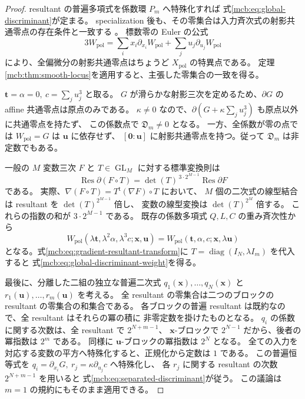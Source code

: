 \begin{proof}
resultant の普遍多項式を係数環 $P_m$ へ特殊化すれば
式\eqref{mcb:eq:global-discriminant}が定まる。
specialization 後も、その零集合は入力斉次式の射影共通零点の存在条件と一致する
\cite[Proposition~2.4]{CMOBuseJouanolouDiscriminant}。
標数零の Euler の公式
\[
 3W_{\mathrm{pol}}
   =\sum_i x_i\partial_{x_i}W_{\mathrm{pol}}
        +\sum_j u_j\partial_{u_j}W_{\mathrm{pol}}
\]
により、全偏微分の射影共通零点はちょうど $X_{\mathrm{pol}}$ の特異点である。
定理\ref{mcb:thm:smooth-locus}を適用すると、主張した零集合の一致を得る。

$\mathbf t=\alpha=0,\ c=\sum_j u_j^3$ と取る。
$G$ が滑らかな射影三次を定めるため、$\partial G$ の affine 共通零点は原点のみである。
$\kappa\ne0$ なので、$\partial(G+\kappa\sum_j u_j^3)$ も原点以外に共通零点を持たず、
この係数点で $\mathfrak D_m\ne0$ となる。
一方、全係数が零の点では $W_{\mathrm{pol}}=G$ は $\mathbf u$ に依存せず、
$[\mathbf0:\mathbf u]$ に射影共通零点を持つ。従って $\mathfrak D_m$ は非定数でもある。

一般の $M$ 変数三次 $F$ と $T\in\operatorname{GL}_M$ に対する標準変換則は
\begin{equation}\label{mcb:eq:gradient-resultant-transform}
 \operatorname{Res}\partial(F\circ T)
     =\det(T)^{\,3\cdot2^{M-1}}\operatorname{Res}\partial F
\end{equation}
である\cite[Proposition~4.13 and its proof]{CMOBuseJouanolouDiscriminant}。
実際、$\nabla(F\circ T)=T^{\mathsf t}(\nabla F)\circ T$ において、
$M$ 個の二次式の線型結合は resultant を $\det(T)^{2^{M-1}}$ 倍し、
変数の線型変換は $\det(T)^{2^M}$ 倍する。
これらの指数の和が $3\cdot2^{M-1}$ である。
既存の係数多項式 $Q,L,C$ の重み斉次性から
\[
 W_{\mathrm{pol}}(\lambda\mathbf t,\lambda^2\alpha,\lambda^3c;
                         \mathbf x,\mathbf u)
   =W_{\mathrm{pol}}(\mathbf t,\alpha,c;\mathbf x,\lambda\mathbf u)
\]
となる。式\eqref{mcb:eq:gradient-resultant-transform}に
$T=\operatorname{diag}(I_N,\lambda I_m)$ を代入すると
式\eqref{mcb:eq:global-discriminant-weight}を得る。

最後に、分離した二組の独立な普遍二次式
$q_1(\mathbf x),\ldots,q_N(\mathbf x)$ と
$r_1(\mathbf u),\ldots,r_m(\mathbf u)$ を考える。
全 resultant の零集合は二つのブロックの resultant の零集合の和集合である。
各ブロックの普遍 resultant は既約なので、全 resultant はそれらの冪の積に
非零定数を掛けたものとなる。
$q_i$ の係数に関する次数は、全 resultant で $2^{N+m-1}$、
$\mathbf x$-ブロックで $2^{N-1}$ だから、後者の冪指数は $2^m$ である。
同様に $\mathbf u$-ブロックの冪指数は $2^N$ となる。
全ての入力を対応する変数の平方へ特殊化すると、正規化から定数は $1$ である。
この普遍恒等式を $q_i=\partial_{x_i}G,\ r_j=\kappa\partial_{u_j}c$ へ特殊化し、
各 $r_j$ に関する resultant の次数 $2^{N+m-1}$ を用いると
式\eqref{mcb:eq:separated-discriminant}が従う。
この議論は $m=1$ の規約にもそのまま適用できる。
\end{proof}

